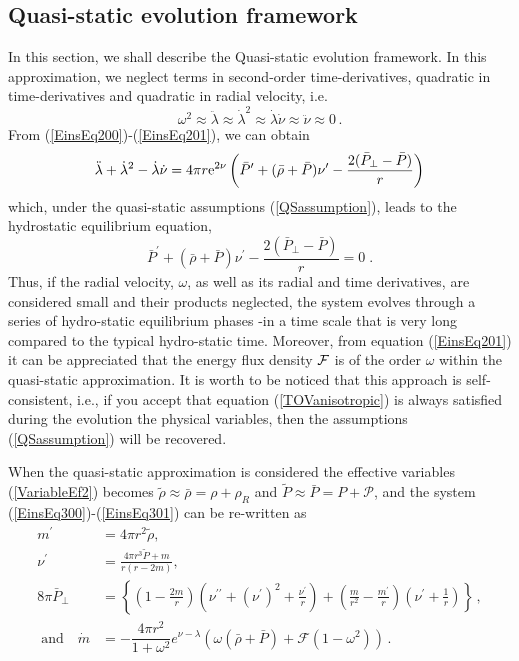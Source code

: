 \documentclass[notitlepage,letterpaper, 10pt]{article}
\begin{document}
\subsection{Quasi-static evolution framework}
In this section, we shall describe the Quasi-static evolution framework. In this approximation, we neglect terms in second-order time-derivatives, quadratic in time-derivatives and quadratic in radial velocity, i.e.
\begin{equation}
\label{QSassumption}
\omega^{2} \approx 
\ddot{\lambda}\approx\dot{\lambda}^2\approx\dot{\lambda}\dot{\nu}\approx\ddot{\nu}\approx 0 \, .
\end{equation}
From (\ref{EinsEq200})-(\ref{EinsEq201}), we can obtain
\begin{equation}\label{hydrostatic}
\ddot{\lambda}+{\dot{\lambda}^2}-{\dot{\lambda} \dot{\nu} }=4\pi r{\rm e}^{2\nu}\left(\bar{P}^{\prime}+{(\bar{\rho} +\bar{P})\nu^{\prime}}-\frac{2(\bar{P}_\perp -\bar{P})}{r}\right)  
\end{equation}
which, under the quasi-static assumptions (\ref{QSassumption}), leads to the hydrostatic equilibrium equation, 
\begin{equation}\label{TOVanisotropic}
\bar{P}^{\prime}+{(\bar{\rho} +\bar{P})\nu^{\prime}}-\frac{2(\bar{P}_\perp -\bar{P})}{r}= 0 \; .
\end{equation} 
Thus, if the radial velocity, $\omega$, as well as its radial and time derivatives, are considered small and their products neglected, the system evolves through a series of hydro-static equilibrium phases  -in a time scale that is very long compared to the typical hydro-static time.  Moreover, from equation (\ref{EinsEq201}) it can be appreciated that the energy flux density ${\cal F}$ is of the order $\omega$ within the quasi-static approximation\cite{HerreraDiPrisco1997,BecerraHernandezNunez2015}.
It is worth to be noticed that this approach is self-consistent, i.e., if you accept that equation (\ref{TOVanisotropic}) is always satisfied during the evolution the physical variables, then the assumptions (\ref{QSassumption}) will be recovered.

When the quasi-static approximation is considered the effective variables (\ref{VariableEf2}) becomes $\tilde{\rho} \approx \bar{\rho}= \rho+ \rho_{R}$ and $\tilde{P} \approx \bar{P} = P+ \mathcal{P}$, and the system (\ref{EinsEq300})-(\ref{EinsEq301}) can be re-written as
\begin{align}
m^{\prime} &= 4 \pi r^{2}\tilde{\rho}, \label{EinsEq400} \\
\nu^{\prime} & = \frac{4\pi r^{3}\tilde{P}+ m}{r(r-2m)}, \label{EinsEq411} \\
8\pi \bar{P}_{\perp} &= \left\{ \left( 1-\frac{2m}{r} \right) \left( \nu^{\prime \prime} + (\nu^{\prime})^{2}+ \frac{\nu^{\prime}}{r}  \right) + \left(  \frac{m}{r^{2}} -\frac{m^{\prime }}{r}  \right) \left( \nu^{\prime} + \frac{1}{r}     \right)   \right\} \, ,  \label{EinsEq422} \\
\; \textrm{and} \quad \dot{m} &= 
-\dfrac{4 \pi r^{2}}{1+\omega^{2}} e^{\nu-\lambda}
\left( \omega(\bar{\rho}+ \bar{P})+ \mathcal{F}\left( 1-\omega^{2}\right) \right)  \label{EinsEq401}\, .
\end{align}
\end{document}
